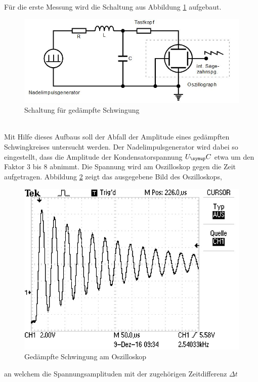 Für die erste Messung wird die Schaltung aus Abbildung \ref{fig:schlt1}
aufgebaut.
\begin{figure}[h]
  \centering
  \includegraphics[width=\textwidth]{Bilder/dmpfschalt.JPG}
  \caption{Schaltung für gedämpfte Schwingung\,\cite{354}}
  \label{fig:schlt1}
\end{figure} \\
Mit Hilfe dieses Aufbaus soll der Abfall der Amplitude eines gedämpften
Schwingkreises untersucht werden. Der Nadelimpulsgenerator wird dabei so
eingestellt, dass die Amplitude der Kondensatorspannung $U_\su{C}$ etwa um
den Faktor 3 bis 8 abnimmt. Die Spannung wird am Oszilloskop gegen die Zeit
aufgetragen.
Abbildung \ref{fig:dämpfung} zeigt das ausgegebene Bild des Oszilloskops,
\begin{figure} %
  \centering
  \includegraphics{Bilder/Dmpfung.JPG}
  \caption{Gedämpfte Schwingung am Oszilloskop}
  \label{fig:dämpfung}
\end{figure}
an welchem die Spannungsamplituden mit der zugehörigen Zeitdifferenz $\Delta t$
